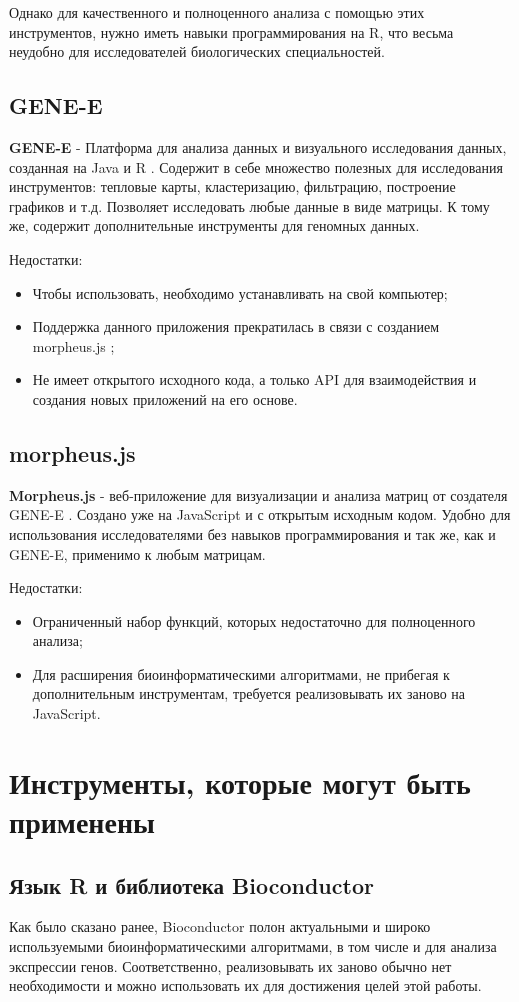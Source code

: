\documentclass[specification,annotation]{itmo-student-thesis}
\begin{document}
Однако для качественного и полноценного анализа с помощью этих инструментов, нужно иметь навыки программирования на R, что весьма неудобно для исследователей биологических специальностей.

\subsection{GENE-E}
\textbf{GENE-E} - Платформа для анализа данных и визуального исследования данных, созданная на Java и R \cite{genee}. Содержит в себе множество полезных для исследования инструментов: тепловые карты, кластеризацию, фильтрацию, построение графиков и т.д. Позволяет исследовать любые данные в виде матрицы. К тому же, содержит дополнительные инструменты для геномных данных.

Недостатки:
\begin{itemize}
\item Чтобы использовать, необходимо устанавливать на свой компьютер;
\item Поддержка данного приложения прекратилась в связи с созданием morpheus.js \cite{morpheus};
\item Не имеет открытого исходного кода, а только API для взаимодействия и создания новых приложений на его основе.
\end{itemize}

\subsection{morpheus.js}
\textbf{Morpheus.js} - веб-приложение для визуализации и анализа матриц от создателя GENE-E \cite{morpheus}. Создано уже на JavaScript и с открытым исходным кодом. Удобно для использования исследователями без навыков программирования и так же, как и GENE-E, применимо к любым матрицам.

Недостатки:
\begin{itemize}
\item Ограниченный набор функций, которых недостаточно для полноценного анализа;
\item Для расширения биоинформатическими алгоритмами, не прибегая к дополнительным инструментам, требуется реализовывать их заново на JavaScript.
\end{itemize}

\section{Инструменты, которые могут быть применены}
\subsection{Язык R и библиотека Bioconductor}
Как было сказано ранее, Bioconductor полон актуальными и широко используемыми биоинформатическими алгоритмами, в том числе и для анализа экспрессии генов. Соответственно, реализовывать их заново обычно нет необходимости и можно использовать их для достижения целей этой работы.
\end{document}
